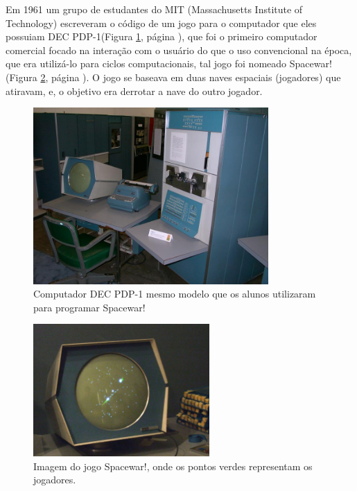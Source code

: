 \documentclass[12pt]{article}
\begin{document}
 Em 1961 um grupo de estudantes do MIT (Massachusetts Institute of Technology) escreveram o código de um jogo para o computador que eles possuiam DEC PDP-1(Figura \ref{fig:pc-velho}, página \pageref{fig:pc-velho}), que foi o primeiro computador comercial focado na interação com o usuário do que o uso convencional na época, que era utilizá-lo para ciclos computacionais, tal jogo foi nomeado Spacewar!(Figura \ref{fig:spacewar}, página \pageref{fig:spacewar}). O jogo se baseava em duas naves espaciais (jogadores) que atiravam, e, o objetivo era derrotar a nave do outro jogador. 
\linebreak
\begin{figure}[!htb]
    \centering
    \includegraphics[width=0.8\textwidth]{pc-velho.jpg}
    \caption{Computador DEC PDP-1 mesmo modelo que os alunos utilizaram para programar Spacewar!}
    \label{fig:pc-velho}
\end{figure}
\linebreak
\begin{figure}[!htb]
    \centering
    \includegraphics[width=0.6\textwidth]{spacewar.jpg}
    \caption{Imagem do jogo Spacewar!, onde os pontos verdes representam os jogadores.}
    \label{fig:spacewar}
\end{figure}
\linebreak
\end{document}
